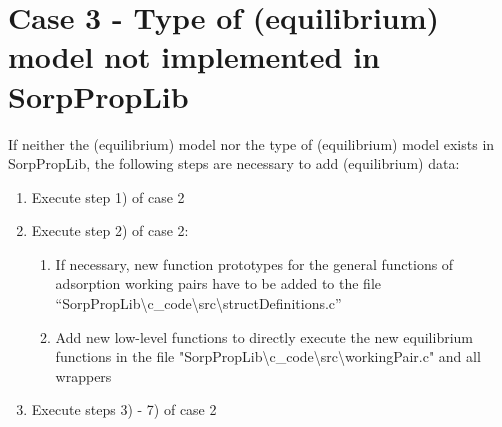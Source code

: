 \section{Case 3 - Type of (equilibrium) model not implemented in SorpPropLib}
\label{cha:extensions:case3}
%
If neither the (equilibrium) model nor the type of (equilibrium) model exists in SorpPropLib, the following steps are necessary to add (equilibrium) data:
\begin{enumerate}
	\item Execute step 1) of case 2
	\item Execute step 2) of case 2:
	\begin{enumerate}
		\item If necessary, new function prototypes for the general functions of adsorption working pairs have to be added to the file “SorpPropLib\textbackslash c\_code\textbackslash src\textbackslash \newline structDefinitions.c”
		\item Add new low-level functions to directly execute the new equilibrium functions in the file "SorpPropLib\textbackslash c\_code\textbackslash src\textbackslash workingPair.c" and all wrappers
	\end{enumerate}
\item Execute steps 3) - 7) of case 2
\end{enumerate}
